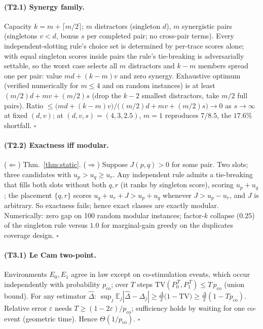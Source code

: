 \documentclass[10pt,twocolumn]{article}
\theoremstyle{definition}
\begin{document}
\paragraph{(T2.1) Synergy family.}
Capacity $k=m+\lceil m/2\rceil$; $m$ distractors (singleton $d$), $m$ synergistic pairs
(singletons $v<d$, bonus $s$ per completed pair; no cross-pair terms). Every
independent-slotting rule's choice set is determined by per-trace scores alone; with equal
singleton scores inside pairs the rule's tie-breaking is adversarially settable, so the
worst case selects all $m$ distractors and $k-m$ members spread one per pair: value
$md+(k-m)v$ and zero synergy. Exhaustive optimum (verified numerically for $m\le4$ and on
random instances) is at least $(m/2)d+mv+(m/2)s$ (drop the $k-2$ smallest distractors, take
$m/2$ full pairs). Ratio $\le \bigl(md+(k-m)v\bigr)/\bigl((m/2)d+mv+(m/2)s\bigr)\to0$
as $s\to\infty$ at fixed $(d,v)$; at $(d,v,s)=(4,3,2.5)$, $m=1$ reproduces $7/8.5$, the
$17.6\%$ shortfall. \hfill$\square$

\paragraph{(T2.2) Exactness iff modular.}
($\Leftarrow$) Thm.~\ref{thm:static}. ($\Rightarrow$) Suppose $J(p,q)>0$ for some pair.
Two slots; three candidates with $u_p>u_q\ge u_r$. Any independent rule admits a
tie-breaking that fills both slots without both $q,r$ (it ranks by singleton score), scoring
$u_p+u_q$; the placement $\{q,r\}$ scores $u_q+u_r+J>u_p+u_q$ whenever $J>u_p-u_r$, and
$J$ is arbitrary. So exactness fails; hence exact classes are exactly modular. Numerically:
zero gap on 100 random modular instances; factor-$k$ collapse ($0.25$) of the singleton
rule versus $1.0$ for marginal-gain greedy on the duplicates coverage design. \hfill$\square$

\paragraph{(T3.1) Le Cam two-point.}
Environments $E_0,E_1$ agree in law except on co-stimulation events, which occur
independently with probability $p_{\mathrm{co}}$; over $T$ steps
$\mathrm{TV}(P_0^{\,T},P_1^{\,T})\le T\,p_{\mathrm{co}}$ (union bound). For any estimator
$\hat\Delta$: $\sup_{j}\mathbb E_j|\hat\Delta-\Delta_j|
\ge\tfrac{\Delta}{2}\bigl(1-\mathrm{TV}\bigr)\ge\tfrac{\Delta}{2}(1-Tp_{\mathrm{co}})$.
Relative error $\varepsilon$ needs $T\ge(1-2\varepsilon)/p_{\mathrm{co}}$; sufficiency holds
by waiting for one co-event (geometric time). Hence $\Theta(1/p_{\mathrm{co}})$.
\hfill$\square$
\end{document}
